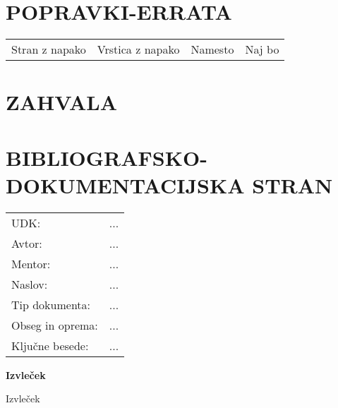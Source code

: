 \section*{POPRAVKI-ERRATA}
\hspace{-2.25mm}\begin{tabular}[width=16cm,left]{p{3.75cm} p{5cm} p{3.75cm} p{2cm}}
   Stran z napako & Vrstica z napako & Namesto & Naj bo
\end{tabular}




\newpage
{}
\section*{ZAHVALA}




\newpage
{}
\section*{BIBLIOGRAFSKO-DOKUMENTACIJSKA STRAN}
\renewcommand{\arraystretch}{1.4}

\begin{bf}
    \vspace{-1.5mm}\hspace{-2.25mm}
    \begin{tabular}{p{3.75cm} l}
        UDK: &  ...\\
        Avtor: & ...\\
        Mentor: & ...\\
        Naslov: & ...\\
        Tip dokumenta: & ...\\
        Obseg in oprema: & ...\\
        Ključne besede: & ...
    \end{tabular}
\end{bf}

\vspace{1cm}

\noindent\textbf{Izvleček}

\vspace{4mm}

\noindent Izvleček
\break



\newpage
{}
